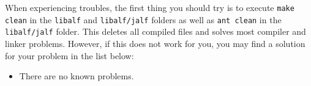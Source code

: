 When experiencing troubles, the first thing you should try is to execute \texttt{make clean} in the \texttt{libalf} and \texttt{libalf/jalf} folders as well as \texttt{ant clean} in the \texttt{libalf/jalf} folder. This deletes all compiled files and solves most compiler and linker problems. However, if this does not work for you, you may find a solution for your problem in the list below:

\begin{itemize}
  \item There are no known problems.
\end{itemize}
